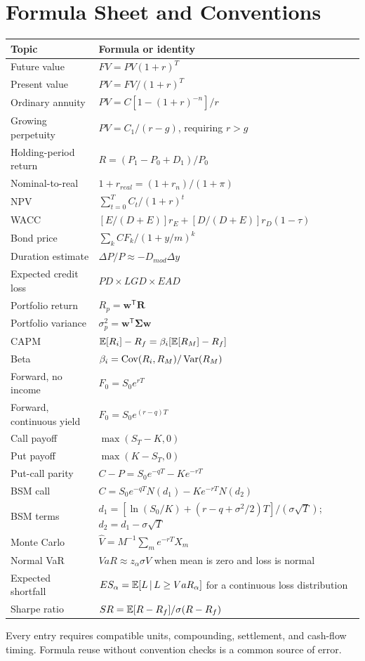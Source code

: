 \chapter{Formula Sheet and Conventions}

\small
\begin{longtable}{@{}p{}p{}@{}}
\toprule
Topic & Formula or identity \\
\midrule
\endhead
Future value & $FV=PV(1+r)^T$ \\
Present value & $PV=FV/(1+r)^T$ \\
Ordinary annuity & $PV=C[1-(1+r)^{-n}]/r$ \\
Growing perpetuity & $PV=C_1/(r-g)$, requiring $r>g$ \\
Holding-period return & $R=(P_1-P_0+D_1)/P_0$ \\
Nominal-to-real & $1+r_{real}=(1+r_n)/(1+\pi)$ \\
NPV & $\sum_{t=0}^{T}C_t/(1+r)^t$ \\
WACC & $[E/(D+E)]r_E+[D/(D+E)]r_D(1-\tau)$ \\
Bond price & $\sum_k CF_k/(1+y/m)^k$ \\
Duration estimate & $\Delta P/P\approx-D_{mod}\Delta y$ \\
Expected credit loss & $PD\times LGD\times EAD$ \\
Portfolio return & $R_p=\mathbf w^{\mathsf T}\mathbf R$ \\
Portfolio variance & $\sigma_p^2=\mathbf w^{\mathsf T}\boldsymbol\Sigma\mathbf w$ \\
CAPM & $\mathbb{E}[R_i]-R_f=\beta_i[\mathbb{E}[R_M]-R_f]$ \\
Beta & $\beta_i=\operatorname{Cov}(R_i,R_M)/\operatorname{Var}(R_M)$ \\
Forward, no income & $F_0=S_0e^{rT}$ \\
Forward, continuous yield & $F_0=S_0e^{(r-q)T}$ \\
Call payoff & $\max(S_T-K,0)$ \\
Put payoff & $\max(K-S_T,0)$ \\
Put-call parity & $C-P=S_0e^{-qT}-Ke^{-rT}$ \\
BSM call & $C=S_0e^{-qT}N(d_1)-Ke^{-rT}N(d_2)$ \\
BSM terms & $d_1=[\ln(S_0/K)+(r-q+\sigma^2/2)T]/(\sigma\sqrt T)$; $d_2=d_1-\sigma\sqrt T$ \\
Monte Carlo & $\hat V=M^{-1}\sum_m e^{-rT}X_m$ \\
Normal VaR & $VaR\approx z_\alpha\sigma V$ when mean is zero and loss is normal \\
Expected shortfall & $ES_\alpha=\mathbb{E}[L\,|\, L\geq VaR_\alpha]$ for a continuous loss distribution \\
Sharpe ratio & $SR=\mathbb{E}[R-R_f]/\sigma(R-R_f)$ \\
\bottomrule
\end{longtable}
\normalsize

Every entry requires compatible units, compounding, settlement, and cash-flow timing. Formula reuse without convention checks is a common source of error.

